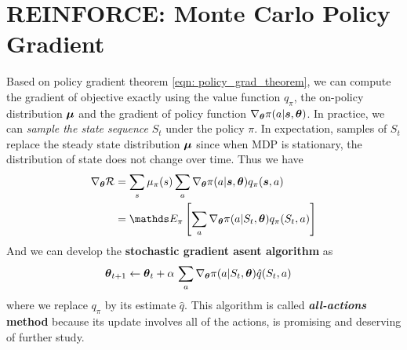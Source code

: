 \documentclass[11pt]{article}
\begin{document}
\section{REINFORCE: Monte Carlo Policy Gradient}
Based on policy gradient theorem \eqref{eqn: policy_grad_theorem}, we can compute the gradient of objective exactly using the value function $q_{\pi}$, the on-policy distribution $\boldsymbol{\mu}$ and the gradient of policy function $\nabla_{\boldsymbol{\theta}}{\pi(a|\boldsymbol{s}, \boldsymbol{\theta})}$. In practice, we can \emph{sample the state sequence} $S_{t}$ under the policy $\pi$. In expectation, samples of $S_{t}$ replace the steady state distribution $\boldsymbol{\mu}$ since when MDP is stationary, the distribution of state does not change over time. Thus we have 
\begin{align*}
\grad{\mb{\theta}}{\cR} &=  \sum_{s}\mu_{\pi}(s)\sum_{a}\grad{\mb{\theta}}{\pi(a|\mb{s}, \mb{\theta})}q_{\pi}(\mb{s}, a) \\
&= \E{\pi}{\sum_{a}\grad{\mb{\theta}}{\pi(a|S_{t}, \mb{\theta})}q_{\pi}(S_{t}, a) }
\end{align*} And we can develop the \textbf{stochastic gradient asent algorithm} as 
\begin{align}
\boldsymbol{\theta}_{t+1} &\leftarrow \boldsymbol{\theta}_{t} + \alpha\,\sum_{a}\nabla_{\boldsymbol{\theta}}{\pi(a|S_{t}, \boldsymbol{\theta})}\hat{q}(S_{t}, a) \label{eqn: policy_grad_sga}
\end{align}  where we replace $q_{\pi}$ by its estimate $\hat{q}$. This algorithm is called \textbf{\emph{all-actions} method} because its update involves all of the actions, is promising and deserving of further study.
\end{document}
